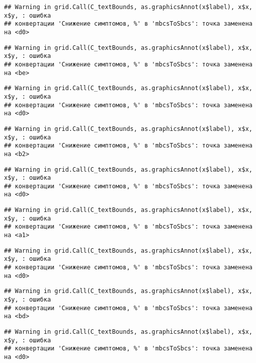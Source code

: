 \documentclass[
]{article}
\begin{document}
\begin{verbatim}
## Warning in grid.Call(C_textBounds, as.graphicsAnnot(x$label), x$x, x$y, : ошибка
## конвертации 'Снижение симптомов, %' в 'mbcsToSbcs': точка заменена на <d0>
\end{verbatim}

\begin{verbatim}
## Warning in grid.Call(C_textBounds, as.graphicsAnnot(x$label), x$x, x$y, : ошибка
## конвертации 'Снижение симптомов, %' в 'mbcsToSbcs': точка заменена на <be>
\end{verbatim}

\begin{verbatim}
## Warning in grid.Call(C_textBounds, as.graphicsAnnot(x$label), x$x, x$y, : ошибка
## конвертации 'Снижение симптомов, %' в 'mbcsToSbcs': точка заменена на <d0>
\end{verbatim}

\begin{verbatim}
## Warning in grid.Call(C_textBounds, as.graphicsAnnot(x$label), x$x, x$y, : ошибка
## конвертации 'Снижение симптомов, %' в 'mbcsToSbcs': точка заменена на <b2>
\end{verbatim}

\begin{verbatim}
## Warning in grid.Call(C_textBounds, as.graphicsAnnot(x$label), x$x, x$y, : ошибка
## конвертации 'Снижение симптомов, %' в 'mbcsToSbcs': точка заменена на <d0>
\end{verbatim}

\begin{verbatim}
## Warning in grid.Call(C_textBounds, as.graphicsAnnot(x$label), x$x, x$y, : ошибка
## конвертации 'Снижение симптомов, %' в 'mbcsToSbcs': точка заменена на <a1>
\end{verbatim}

\begin{verbatim}
## Warning in grid.Call(C_textBounds, as.graphicsAnnot(x$label), x$x, x$y, : ошибка
## конвертации 'Снижение симптомов, %' в 'mbcsToSbcs': точка заменена на <d0>
\end{verbatim}

\begin{verbatim}
## Warning in grid.Call(C_textBounds, as.graphicsAnnot(x$label), x$x, x$y, : ошибка
## конвертации 'Снижение симптомов, %' в 'mbcsToSbcs': точка заменена на <bd>
\end{verbatim}

\begin{verbatim}
## Warning in grid.Call(C_textBounds, as.graphicsAnnot(x$label), x$x, x$y, : ошибка
## конвертации 'Снижение симптомов, %' в 'mbcsToSbcs': точка заменена на <d0>
\end{verbatim}
\end{document}
